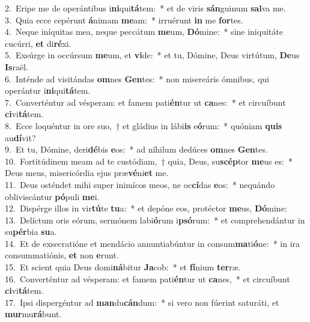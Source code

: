 {2.~}Eripe me de operántibus i\textbf{ni}qui\textbf{tá}tem:~* et de viris \textbf{sán}guinum \textbf{sal}va me.\\
{3.~}Quia ecce cepérunt \textbf{á}nimam \textbf{me}am:~* irruérunt \textbf{in} me \textbf{for}tes.\\
{4.~}Neque iníquitas mea, neque peccátum \textbf{me}um, \textbf{Dó}mine:~* sine iniquitáte cucúrri, \textbf{et} di\textbf{ré}xi.\\
{5.~}Exsúrge in occúrsum \textbf{me}um, et \textbf{vi}de:~* et tu, Dómine, Deus virtútum, \textbf{De}us \textbf{Is}raël.\\
{6.~}Inténde ad visitándas \textbf{om}nes \textbf{Gen}tes:~* non misereáris ómnibus, qui operántur i\textbf{ni}qui\textbf{tá}tem.\\
{7.~}Converténtur ad vésperam: et famem pati\textbf{én}tur ut \textbf{ca}nes:~* et circuíbunt \textbf{ci}vi\textbf{tá}tem.\\
{8.~}Ecce loquéntur in ore suo,~† et gládius in lábi\textbf{is} e\textbf{ó}rum:~* quóniam \textbf{quis} au\textbf{dí}vit?\\
{9.~}Et tu, Dómine, deri\textbf{dé}bis \textbf{e}os:~* ad níhilum dedúces \textbf{om}nes \textbf{Gen}tes.\\
{10.~}Fortitúdinem meam ad te custódiam,~† quia, Deus, su\textbf{scép}tor \textbf{me}us es:~* Deus meus, misericórdia ejus præ\textbf{vé}ni\textbf{et} me.\\
{11.~}Deus osténdet mihi super inimícos meos, ne oc\textbf{cí}das \textbf{e}os:~* nequándo obliviscántur \textbf{pó}puli \textbf{me}i.\\
{12.~}Dispérge illos in vir\textbf{tú}te \textbf{tu}a:~* et depóne eos, protéctor \textbf{me}us, \textbf{Dó}mine:\\
{13.~}Delíctum oris eórum, sermónem labi\textbf{ó}rum i\textbf{psó}rum:~* et comprehendántur in su\textbf{pér}bia \textbf{su}a.\\
{14.~}Et de exsecratióne et mendácio annuntiabúntur in consum\textbf{ma}ti\textbf{ó}ne:~* in ira consummatiónis, \textbf{et} non \textbf{e}runt.\\
{15.~}Et scient quia Deus domi\textbf{ná}bitur \textbf{Ja}cob:~* et \textbf{fí}nium \textbf{ter}ræ.\\
{16.~}Converténtur ad vésperam: et famem pati\textbf{én}tur ut \textbf{ca}nes,~* et circuíbunt \textbf{ci}vi\textbf{tá}tem.\\
{17.~}Ipsi dispergéntur ad \textbf{man}du\textbf{cán}dum:~* si vero non fúerint saturáti, et \textbf{mur}mu\textbf{rá}bunt.\\
